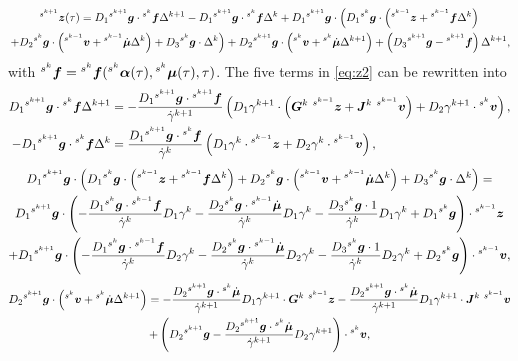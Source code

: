 \documentclass[../DC2019003Bouma.tex]{subfiles}
\begin{document}
\begin{multline}
\hspace{0cm}^{s^{k+1}}{\boldsymbol{z}}(\tau) = D_1\hspace{0cm}^{s^{k+1}}{\boldsymbol{g}}\cdot\hspace{0cm}^{s^{k}}{\boldsymbol{f}}\Delta^{k+1} - D_1\hspace{0cm}^{s^{k+1}}{\boldsymbol{g}}\cdot\hspace{0cm}^{s^{k}}{\boldsymbol{f}}\Delta^{k} + D_1\hspace{0cm}^{s^{k+1}}{\boldsymbol{g}}\cdot\left(D_1\hspace{0cm}^{s^{k}}{\boldsymbol{g}}\cdot\left(\hspace{0cm}^{s^{k-1}}{\boldsymbol{z}}+\hspace{0cm}^{s^{k-1}}{\boldsymbol{f}}\Delta^{k}\right)\right.\\
\left.+D_2\hspace{0cm}^{s^{k}}{\boldsymbol{g}}\cdot\left(\hspace{0cm}^{s^{k-1}}{\boldsymbol{v}}+\hspace{0cm}^{s^{k-1}}\dot{\boldsymbol{\mu}}\Delta^{k}\right)+D_3\hspace{0cm}^{s^{k}}{\boldsymbol{g}}\cdot\Delta^{k}\right) + D_2 \hspace{0cm}^{s^{k+1}}{\boldsymbol{g}}\cdot\left(\hspace{0cm}^{s^{k}}{\boldsymbol{v}}+\hspace{0cm}^{s^{k}}\dot{\boldsymbol{\mu}}\Delta^{k+1} \right) + \left(D_3\hspace{0cm}^{s^{k+1}}{\boldsymbol{g}} - \hspace{0cm}^{s^{k+1}}{\boldsymbol{f}}\right)\Delta^{k+1},\label{eq:z2}
\end{multline}
with $\hspace{0cm}^{s^k}{\boldsymbol{f}} = \hspace{0cm}^{s^k}{\boldsymbol{f}}(\hspace{0cm}^{s^k}\boldsymbol{\alpha}(\tau),\hspace{0cm}^{s^k}\boldsymbol{\mu}(\tau),\tau)$. The five terms in \eqref{eq:z2} can be rewritten into
\begin{align}
D_1\ls^{s^{k+1}}\gb\cdot\ls^{s^{k}}\fb\Delta^{k+1} &= -\frac{D_1\ls^{s^{k+1}}\gb\cdot\ls^{s^{k+1}}\fb}{\dot{\gamma}^{k+1}}\left(D_1\gamma^{k+1}\cdot\left(\Gb^{k}\ \ls^{s^{k-1}}\zb+\Jb^{k}\ \ls^{s^{k-1}}\vb\right) +D_2\gamma^{k+1}\cdot\ls^{s^{k}}\vb\right),\\
-D_1\ls^{s^{k+1}}\gb\cdot\ls^{s^{k}}\fb\Delta^{k} &= \frac{D_1\ls^{s^{k+1}}\gb\cdot\ls^{s^{k}}\fb}{\dot{\gamma}^{k}}\left(D_1\gamma^{k}\cdot\ls^{s^{k-1}}\zb + D_2\gamma^{k}\cdot\ls^{s^{k-1}}\vb\right),
\end{align}
\begin{multline}
D_1\hspace{0cm}^{s^{k+1}}{\boldsymbol{g}}\cdot\left(D_1\hspace{0cm}^{s^{k}}{\boldsymbol{g}}\cdot\left(\hspace{0cm}^{s^{k-1}}{\boldsymbol{z}} + \hspace{0cm}^{s^{k-1}}{\boldsymbol{f}}\Delta^{k}\right) + D_2\hspace{0cm}^{s^{k}}{\boldsymbol{g}}\cdot\left(\hspace{0cm}^{s^{k-1}}{\boldsymbol{v}}+\hspace{0cm}^{s^{k-1}}\dot{\boldsymbol{\mu}}\Delta^{k}\right) + D_3\hspace{0cm}^{s^{k}}{\boldsymbol{g}}\cdot\Delta^{k}\right) = \\
D_1\hspace{0cm}^{s^{k+1}}{\boldsymbol{g}}\cdot\left(-\frac{D_1\hspace{0cm}^{s^{k}}{\boldsymbol{g}}\cdot\hspace{0cm}^{s^{k-1}}{\boldsymbol{f}}}{\dot{\gamma}^{k}}D_1\gamma^{k} - \frac{D_2\hspace{0cm}^{s^{k}}{\boldsymbol{g}}\cdot\hspace{0cm}^{s^{k-1}}\dot{\boldsymbol{\mu}}}{\dot{\gamma}^{k}}D_1\gamma^{k} - \frac{D_3\hspace{0cm}^{s^{k}}{\boldsymbol{g}}\cdot 1}{\dot{\gamma}^{k}}D_1\gamma^{k} + D_1\hspace{0cm}^{s^{k}}{\boldsymbol{g}}\right)\cdot\hspace{0cm}^{s^{k-1}}{\boldsymbol{z}} \\
+ D_1\hspace{0cm}^{s^{k+1}}{\boldsymbol{g}}\cdot\left(-\frac{D_1\hspace{0cm}^{s^{k}}{\boldsymbol{g}}\cdot\hspace{0cm}^{s^{k-1}}{\boldsymbol{f}}}{\dot{\gamma}^{k}}D_2\gamma^{k} - \frac{D_2\hspace{0cm}^{s^{k}}{\boldsymbol{g}}\cdot\hspace{0cm}^{s^{k-1}}\dot{\boldsymbol{\mu}}}{\dot{\gamma}^{k}}D_2\gamma^{k} - \frac{D_3\hspace{0cm}^{s^{k}}{\boldsymbol{g}}\cdot 1}{\dot{\gamma}^{k}}D_2\gamma^{k} + D_2\hspace{0cm}^{s^{k}}{\boldsymbol{g}} \right)\cdot \hspace{0cm}^{s^{k-1}}{\boldsymbol{v}},
\end{multline}
\begin{multline}
D_2 \ls^{s^{k+1}}\gb\cdot\left(\ls^{s^{k}}\vb+\ls^{s^{k}}\dot{\mub}\Delta^{k+1} \right) = -\frac{D_2\ls^{s^{k+1}}\gb\cdot\ls^{s^k}\dot{\mub}}{\dot{\gamma}^{k+1}}D_1\gamma^{k+1}\cdot\Gb^k\ \ls^{s^{k-1}}\zb -\frac{D_2\ls^{s^{k+1}}\gb\cdot\ls^{s^k}\dot{\mub}}{\dot{\gamma}^{k+1}}D_1\gamma^{k+1}\cdot\Jb^k\ \ls^{s^{k-1}}\vb\\ + \left(D_2\ls^{s^{k+1}}\gb - \frac{D_2\ls^{s^{k+1}}\gb\cdot\ls^{s^k}\dot{\mub}}{\dot{\gamma}^{k+1}}D_2\gamma^{k+1}\right)\cdot\ls^{s^k}\vb,
\end{multline}
\end{document}
